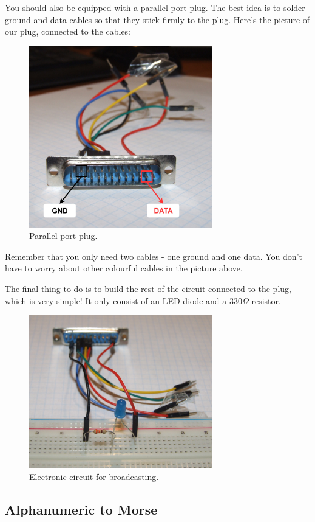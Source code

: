 \documentclass[12pt]{report}
\begin{document}
You should also be equipped with a parallel port plug. The best idea is to solder ground and data cables so that they stick firmly to the plug. Here's the picture of our plug, connected to the cables:

\begin{figure}[H]
\centering\includegraphics[width=8cm]{parport_plug}
\caption{Parallel port plug.}				
\label{fig:parport_plug}
\end{figure}

Remember that you only need two cables - one ground and one data. You don't have to worry about other colourful cables in the picture above.

The final thing to do is to build the rest of the circuit connected to the plug, which is very simple! It only consist of an LED diode and a 330$\Omega$ resistor.

\begin{figure}[H]
\centering\includegraphics[width=8cm]{broadcast_circuit}
\caption{Electronic circuit for broadcasting.}				
\label{fig:broadcast_circuit}
\end{figure}

\subsection{Alphanumeric to Morse} \label{sec:asciitomorse}
\end{document}
